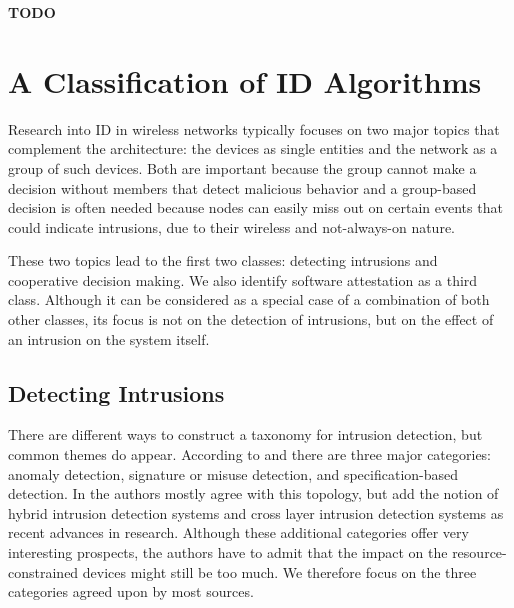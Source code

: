 \documentclass[conference]{IEEEtran}
\newcommand{\TODO}{\textbf{\color{red}TODO}}
\begin{document}
\TODO

\section{A Classification of ID Algorithms}
\label{classification}

Research into ID in wireless networks typically focuses on two major topics
that complement the architecture: the devices as single entities and the
network as a group of such devices. Both are important because the group cannot
make a decision without members that detect malicious behavior and a
group-based decision is often needed because nodes can easily miss out on
certain events that could indicate intrusions, due to their wireless and
not-always-on nature.

These two topics lead to the first two classes: detecting intrusions and
cooperative decision making. We also identify software attestation as a third
class. Although it can be considered as a special case of a combination of both
other classes, its focus is not on the detection of intrusions, but on the
effect of an intrusion on the system itself.

\subsection*{Detecting Intrusions}
\label{detection}

There are different ways to construct a taxonomy for intrusion detection, but
common themes do appear. According to \cite{mishra2004intrusion} and
\cite{ioannis2007towards} there are three major categories: anomaly detection,
signature or misuse detection, and specification-based detection. In
\cite{alrajeh2013intrusion} the authors mostly agree with this topology, but
add the notion of hybrid intrusion detection systems and cross layer intrusion
detection systems as recent advances in research. Although these additional
categories offer very interesting prospects, the authors have to admit that the
impact on the resource-constrained devices might still be too much. We
therefore focus on the three categories agreed upon by most sources.
\end{document}
